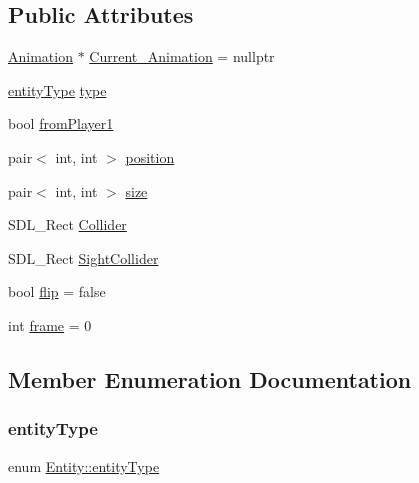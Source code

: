 \subsection*{Public Attributes}
\begin{DoxyCompactItemize}
\item 
\mbox{\hyperlink{class_animation}{Animation}} $\ast$ \mbox{\hyperlink{class_entity_a676763aaf9b176d5ff525451a7cbca64}{Current\+\_\+\+Animation}} = nullptr
\item 
\mbox{\hyperlink{class_entity_afd4a8ca3ac152f193c21d6a5100f1192}{entity\+Type}} \mbox{\hyperlink{class_entity_a70da6c268b2cc0b615095dcb762a51d0}{type}}
\item 
bool \mbox{\hyperlink{class_entity_a5fe6722faf9157181a4385b9daec5d71}{from\+Player1}}
\item 
pair$<$ int, int $>$ \mbox{\hyperlink{class_entity_aa560df7194deb6d4dd2e1de64b5f1fec}{position}}
\item 
pair$<$ int, int $>$ \mbox{\hyperlink{class_entity_a1a955785fff860b9816998a44a76cbb0}{size}}
\item 
S\+D\+L\+\_\+\+Rect \mbox{\hyperlink{class_entity_a329a2ad35048dfc5fb3ce88ae244a438}{Collider}}
\item 
S\+D\+L\+\_\+\+Rect \mbox{\hyperlink{class_entity_a2f09781634e24a2238cb23ec84fd434e}{Sight\+Collider}}
\item 
bool \mbox{\hyperlink{class_entity_ac2dc5514ff9140af33939bc3056fb796}{flip}} = false
\item 
int \mbox{\hyperlink{class_entity_a806d820393849740ea10917ef5a7f427}{frame}} = 0
\end{DoxyCompactItemize}


\subsection{Member Enumeration Documentation}
\mbox{\label{class_entity_afd4a8ca3ac152f193c21d6a5100f1192}} 
\subsubsection{\texorpdfstring{entityType}{entityType}}
{\footnotesize\ttfamily enum \mbox{\hyperlink{class_entity_afd4a8ca3ac152f193c21d6a5100f1192}{Entity\+::entity\+Type}}}

